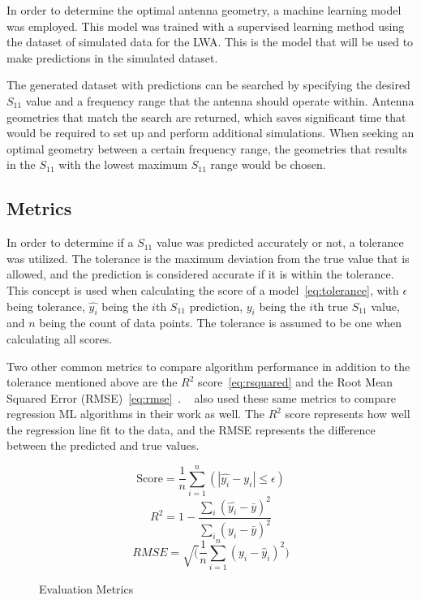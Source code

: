 \documentclass[conference]{IEEEtran}
\begin{document}
In order to determine the optimal antenna geometry, a machine learning model was employed. This model was trained with a supervised learning method using the dataset of simulated data for the LWA. This is the model that will be used to make predictions in the simulated dataset.

The generated dataset with predictions can be searched by specifying the desired $S_{11}$ value and a frequency range that the antenna should operate within. Antenna geometries that match the search are returned, which saves significant time that would be required to set up and perform additional simulations. When seeking an optimal geometry between a certain frequency range, the geometries that results in the $S_{11}$ with the lowest maximum $S_{11}$ range would be chosen.


\subsection{Metrics}
In order to determine if a $S_{11}$ value was predicted accurately or not, a tolerance was utilized. The tolerance is the maximum deviation from the true value that is allowed, and the prediction is considered accurate if it is within the tolerance. This concept is used when calculating the score of a model~\eqref{eq:tolerance}, with $\epsilon$ being tolerance, $\hat{y_i}$ being the $i$th $S_{11}$ prediction, $y_i$ being the $i$th true $S_{11}$ value, and $n$ being the count of data points. The tolerance is assumed to be one when calculating all scores.

Two other common metrics to compare algorithm performance in addition to the tolerance mentioned above are the $R^2$ score~\eqref{eq:rsquared} and the Root Mean Squared Error (RMSE)~\eqref{eq:rmse}~\cite{shcherbakov_survey_2013}. ~\cite{haque_machine_2023,m_el-kenawy_optimized_2022,ranjan_ultra-wideband_2022,sharma_machine_2020,jain_estimation_2022,jain_design_2024} also used these same metrics to compare regression ML algorithms in their work as well. The $R^2$ score represents how well the regression line fit to the data, and the RMSE represents the difference between the predicted and true values.

\begin{figure}[h]
    \begin{equation}
        \text{Score} = \frac{1}{n} \sum_{i=1}^{n}(\left|\hat{y_i} - y_i\right| \leq \epsilon)
        \label{eq:tolerance}
    \end{equation}
    \begin{equation}
        R^2 = 1 - \frac{\sum_{i}(\hat{y_i} - \bar{y})^2}{\sum_{i}(y_i - \bar{y})^2}
        \label{eq:rsquared}
    \end{equation}
    \begin{equation}
        {RMSE} = \sqrt(\frac{1}{n} \sum_{i=1}^{n}(y_i - \hat{y}_i)^2)
        \label{eq:rmse}
    \end{equation}
    \caption{Evaluation Metrics}
\end{figure}
\end{document}

